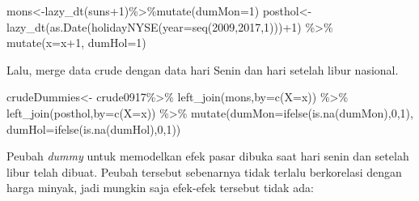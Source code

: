 \documentclass[
]{book}
\newenvironment{Shaded}{\begin{snugshade}}{\end{snugshade}}
\newcommand{\AttributeTok}[1]{\textcolor[rgb]{0.77,0.63,0.00}{#1}}
\newcommand{\DecValTok}[1]{\textcolor[rgb]{0.00,0.00,0.81}{#1}}
\newcommand{\FunctionTok}[1]{\textcolor[rgb]{0.00,0.00,0.00}{#1}}
\newcommand{\NormalTok}[1]{#1}
\newcommand{\OtherTok}[1]{\textcolor[rgb]{0.56,0.35,0.01}{#1}}
\newcommand{\SpecialCharTok}[1]{\textcolor[rgb]{0.00,0.00,0.00}{#1}}
\newcommand{\StringTok}[1]{\textcolor[rgb]{0.31,0.60,0.02}{#1}}
\begin{document}
\begin{Shaded}
\begin{Highlighting}[]
\NormalTok{mons}\OtherTok{\textless{}{-}}\FunctionTok{lazy\_dt}\NormalTok{(suns}\SpecialCharTok{+}\DecValTok{1}\NormalTok{)}\SpecialCharTok{\%\textgreater{}\%}\FunctionTok{mutate}\NormalTok{(}\AttributeTok{dumMon=}\DecValTok{1}\NormalTok{)}
\NormalTok{posthol}\OtherTok{\textless{}{-}}\FunctionTok{lazy\_dt}\NormalTok{(}\FunctionTok{as.Date}\NormalTok{(}\FunctionTok{holidayNYSE}\NormalTok{(}\AttributeTok{year=}\FunctionTok{seq}\NormalTok{(}\DecValTok{2009}\NormalTok{,}\DecValTok{2017}\NormalTok{,}\DecValTok{1}\NormalTok{)))}\SpecialCharTok{+}\DecValTok{1}\NormalTok{) }\SpecialCharTok{\%\textgreater{}\%}
  \FunctionTok{mutate}\NormalTok{(}\AttributeTok{x=}\NormalTok{x}\SpecialCharTok{+}\DecValTok{1}\NormalTok{,}
        \AttributeTok{dumHol=}\DecValTok{1}\NormalTok{)}
\end{Highlighting}
\end{Shaded}

Lalu, merge data crude dengan data hari Senin dan hari setelah libur nasional.

\begin{Shaded}
\begin{Highlighting}[]
\NormalTok{crudeDummies}\OtherTok{\textless{}{-}}\NormalTok{ crude0917}\SpecialCharTok{\%\textgreater{}\%}
  \FunctionTok{left\_join}\NormalTok{(mons,}\AttributeTok{by=}\FunctionTok{c}\NormalTok{(}\StringTok{\textquotesingle{}X\textquotesingle{}}\OtherTok{=}\StringTok{\textquotesingle{}x\textquotesingle{}}\NormalTok{)) }\SpecialCharTok{\%\textgreater{}\%} \FunctionTok{left\_join}\NormalTok{(posthol,}\AttributeTok{by=}\FunctionTok{c}\NormalTok{(}\StringTok{\textquotesingle{}X\textquotesingle{}}\OtherTok{=}\StringTok{\textquotesingle{}x\textquotesingle{}}\NormalTok{)) }\SpecialCharTok{\%\textgreater{}\%}
  \FunctionTok{mutate}\NormalTok{(}\AttributeTok{dumMon=}\FunctionTok{ifelse}\NormalTok{(}\FunctionTok{is.na}\NormalTok{(dumMon),}\DecValTok{0}\NormalTok{,}\DecValTok{1}\NormalTok{),}
         \AttributeTok{dumHol=}\FunctionTok{ifelse}\NormalTok{(}\FunctionTok{is.na}\NormalTok{(dumHol),}\DecValTok{0}\NormalTok{,}\DecValTok{1}\NormalTok{))}
\end{Highlighting}
\end{Shaded}

Peubah \emph{dummy} untuk memodelkan efek pasar dibuka saat hari senin dan setelah libur telah dibuat. Peubah tersebut sebenarnya tidak terlalu berkorelasi dengan harga minyak, jadi mungkin saja efek-efek tersebut tidak ada:
\end{document}
